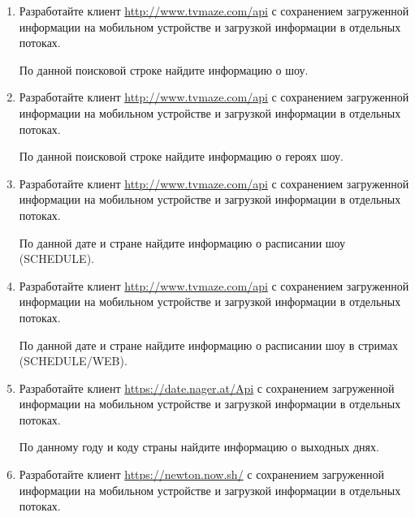 \begin{enumerate}

	\item Разработайте клиент \url{http://www.tvmaze.com/api} с сохранением загруженной информации на мобильном устройстве и загрузкой
		информации в отдельных потоках.

		По данной поисковой строке найдите информацию о шоу.

	\item Разработайте клиент \url{http://www.tvmaze.com/api} с сохранением загруженной информации на мобильном устройстве и загрузкой
		информации в отдельных потоках.

		По данной поисковой строке найдите информацию о героях шоу.

	\item Разработайте клиент \url{http://www.tvmaze.com/api} с сохранением загруженной информации на мобильном устройстве и загрузкой
		информации в отдельных потоках.

		По данной дате и стране найдите информацию о расписании шоу (SCHEDULE).

	\item Разработайте клиент \url{http://www.tvmaze.com/api} с сохранением загруженной информации на мобильном устройстве и загрузкой
		информации в отдельных потоках.

		По данной дате и стране найдите информацию о расписании шоу в стримах (SCHEDULE/WEB).






	\item Разработайте клиент \url{https://date.nager.at/Api} с сохранением загруженной информации на мобильном устройстве и загрузкой
		информации в отдельных потоках. 

		По данному году и коду страны найдите информацию о выходных днях.


	\item Разработайте клиент \url{https://newton.now.sh/} с сохранением загруженной информации на мобильном устройстве и загрузкой
		информации в отдельных потоках. 


\end{enumerate}
